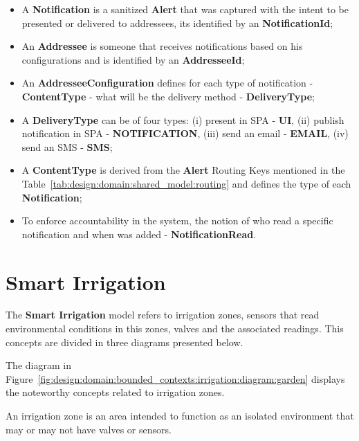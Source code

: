 \begin{itemize}
   \item A \textbf{Notification} is a sanitized \textbf{Alert} that was captured with the intent to be presented or delivered to addressees, its identified by an \textbf{NotificationId};
   \item An \textbf{Addressee} is someone that receives notifications based on his configurations and is identified by an \textbf{AddresseeId};
   \item An \textbf{AddresseeConfiguration} defines for each type of notification - \textbf{ContentType} - what will be the delivery method - \textbf{DeliveryType};
   \item A \textbf{DeliveryType} can be of four types: (i) present in SPA - \textbf{UI}, (ii) publish notification in SPA - \textbf{NOTIFICATION}, (iii) send an email - \textbf{EMAIL}, (iv) send an SMS - \textbf{SMS};
   \item A \textbf{ContentType} is derived from the \textbf{Alert} Routing Keys mentioned in the Table~\ref{tab:design:domain:shared_model:routing} and defines the type of each \textbf{Notification};
   \item To enforce accountability in the system, the notion of who read a specific notification and when was added - \textbf{NotificationRead}.
\end{itemize}

\section{Smart Irrigation}
\label{subsubsec:design:domain:bounded_contexts:irrigation}

The \textbf{Smart Irrigation} model refers to irrigation zones, sensors that read environmental conditions in this zones, valves and the associated readings. This concepts are divided in three diagrams presented below.

The diagram in Figure~\ref{fig:design:domain:bounded_contexts:irrigation:diagram:garden} displays the noteworthy concepts related to irrigation zones.

An irrigation zone is an area intended to function as an isolated environment that may or may not have valves or sensors.

